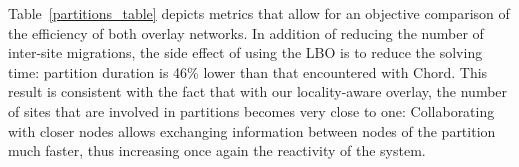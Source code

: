 
Table~\ref{partitions_table} depicts metrics that allow for an objective 
comparison of the efficiency of both overlay networks. In addition of reducing 
the number of inter-site migrations, the side effect of using the LBO is to 
reduce the solving time: partition duration is 46\% lower than that encountered 
with Chord. This result is consistent with the fact that with our locality-aware
overlay, the number of sites that are involved in partitions becomes very close 
to one: Collaborating with closer nodes allows exchanging information between
nodes of the partition much faster, thus increasing once again the reactivity
of the system.

% 
